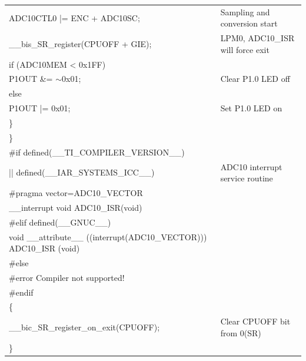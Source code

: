 \documentclass[12pt, letterpaper]{article}
\begin{document}
\begin{longtable}{|p{8.5cm}||p{6cm}|}
  \hspace{0.3cm}    ADC10CTL0 |= ENC + ADC10SC;  & Sampling and conversion start\\
   \hspace{0.3cm} \_\_bis\_SR\_register(CPUOFF + GIE); & LPM0, ADC10\_ISR will force exit\\
    \hspace{0.3cm} if (ADC10MEM < 0x1FF) & \\
     \hspace{0.5cm}P1OUT \&= $\sim$0x01; & Clear P1.0 LED off\\
    \hspace{0.3cm}else & \\
     \hspace{0.5cm} P1OUT |= 0x01; & Set P1.0 LED on\\
  \hspace{0.1cm}\} &\\
\} & \\


\#if defined(\_\_TI\_COMPILER\_VERSION\_\_) & \\
|| defined(\_\_IAR\_SYSTEMS\_ICC\_\_) & ADC10 interrupt service routine\\
\#pragma vector=ADC10\_VECTOR & \\
\_\_interrupt void ADC10\_ISR(void) & \\
\#elif defined(\_\_GNUC\_\_) & \\
void \_\_attribute\_\_ ((interrupt(ADC10\_VECTOR))) ADC10\_ISR (void) & \\
\#else & \\
\#error Compiler not supported! & \\
\#endif & \\
\{ & \\
  \_\_bic\_SR\_register\_on\_exit(CPUOFF);  & Clear CPUOFF bit from 0(SR)\\
\} & \\
	

\end{longtable}
\end{document}
